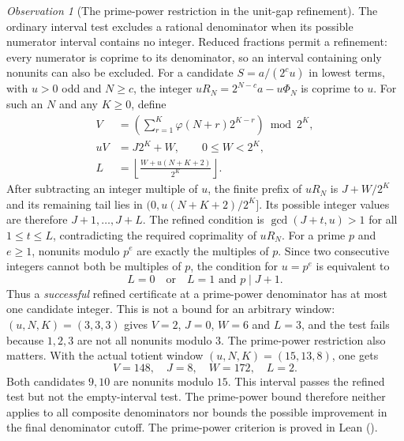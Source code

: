 \documentclass[11pt]{article}
\theoremstyle{plain}
\theoremstyle{definition}
\theoremstyle{remark}
\newtheorem{obs}[thm]{Observation}
\newcommand{\lean}[2]{\leanlink{#2}}
\begin{document}
\begin{obs}[The prime-power restriction in the unit-gap refinement]\label{prop:D8cert-kill}
The ordinary interval test excludes a rational denominator when its
possible numerator interval contains no integer. Reduced fractions
permit a refinement: every numerator is coprime to its denominator,
so an interval containing only nonunits can also be excluded.
For a candidate $S=a/(2^c u)$ in lowest terms, with $u>0$ odd
and $N\ge c$, the integer $uR_N=2^{N-c}a-u\Phi_N$ is coprime
to $u$. For such an $N$ and any $K\ge0$, define
\[
 \begin{aligned}
 V&=\left(\sum_{r=1}^{K}\varphi(N+r)2^{K-r}\right)\bmod2^K,\\
 uV&=J2^K+W,\qquad 0\le W<2^K,\\
 L&=\left\lfloor\frac{W+u(N+K+2)}{2^K}\right\rfloor.
 \end{aligned}
\]
After subtracting an integer multiple of $u$, the finite prefix
of $uR_N$ is $J+W/2^K$ and its remaining tail lies in
$(0,u(N+K+2)/2^K]$. Its possible integer values are therefore
$J+1,\ldots,J+L$. The refined condition is
$\gcd(J+t,u)>1$ for all $1\le t\le L$, contradicting the required
coprimality of $uR_N$.
For a prime $p$ and $e\ge1$, nonunits modulo $p^e$ are exactly the
multiples of $p$. Since two consecutive integers cannot both be
multiples of $p$, the condition for $u=p^e$ is equivalent to
\[
 L=0\quad\text{or}\quad L=1\text{ and }p\mid J+1.
\]
Thus a \emph{successful} refined certificate at a prime-power denominator
has at most one candidate integer. This is not a bound for an arbitrary
window: $(u,N,K)=(3,3,3)$ gives $V=2$, $J=0$, $W=6$ and $L=3$,
and the test fails because $1,2,3$ are not all nonunits modulo $3$.
The prime-power restriction also matters. With the actual totient
window $(u,N,K)=(15,13,8)$, one gets
\[
 V=148,\quad J=8,\quad W=172,\quad L=2.
\]
Both candidates $9,10$ are nonunits modulo $15$. This interval passes
the refined test but not the empty-interval test. The prime-power bound
therefore neither applies to all composite denominators nor bounds the
possible improvement in the final denominator cutoff.
The prime-power criterion is proved in Lean
(\lean{reducedDenominatorCandidateCount_prime_pow_le_one}{PrimitiveWeightCertificate.lean:111}).
\end{obs}
\end{document}
